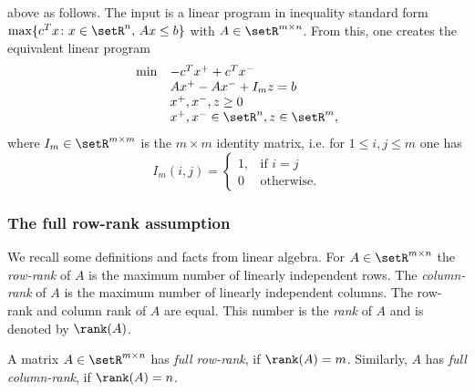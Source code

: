 above as follows. The input is a linear program in inequality standard
form $\max\{c^Tx \colon x \in \setR^n, \,Ax\leq b \}$ with $A \in \setR^{m\times n}$. From this, one creates the
equivalent linear program 
\begin{displaymath}
  \begin{array}{ll}
    \min & -c^T x^+ + c^T x^-  \\
    & A x^+ - A x^- + I_m z =  b\\
     &x^+, x^-, z  \geq 0  \\
    & x^+,x^- \in \setR^n, z \in \setR^m,     
  \end{array}
\end{displaymath}
where $I_m \in \setR^{m\times m}$ is the $m\times m$ identity matrix, i.e. for
$1\leq i,j\leq m$ one has 
\begin{displaymath}
  I_m(i,j) = 
  \begin{cases}
    1, & \text{if } i=j\\
    0 & \text{otherwise.}
  \end{cases}
\end{displaymath}


\subsubsection*{The full row-rank assumption}

We recall some definitions and facts from linear algebra.   For $A \in \setR^{m\times n}$
the \emph{row-rank} of $A$ is the maximum number of linearly independent
rows. The \emph{column-rank} of $A$ is the maximum number of linearly
independent columns. The row-rank and column rank of $A$ are
equal. This number is the \emph{rank} of $A$ and is denoted by
$\rank(A)$. 

\begin{definition}
  \label{def:8}
  A matrix $A \in \setR^{m\times n}$ has \emph{full row-rank}, if $\rank(A) =
  m$. Similarly, $A$ has \emph{full column-rank}, if $\rank(A) =n$. 
\end{definition}

